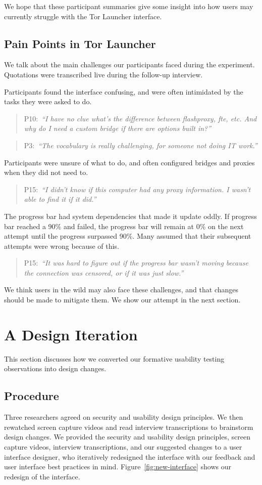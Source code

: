 \documentclass[USenglish,oneside,twocolumn]{article}
\newcommand{\pquote}[2]{
\begin{quotation}
\noindent #1:~\textit{#2}
\end{quotation}
}
\begin{document}
We hope that these participant summaries give some insight into how users may currently struggle with the Tor Launcher interface. 

\subsection{Pain Points in Tor Launcher} 
\label{sec:pain-points}
We talk about the main challenges our participants faced during the experiment. 
Quotations were transcribed live during the follow-up interview.

Participants found the interface confusing, and were often intimidated by the tasks they were asked to do. 

\pquote{P10}{``I have no clue what's the difference between flashproxy, fte, etc. And why do I need a custom bridge if there are options built in?''}

\pquote{P3}{``The vocabulary is really challenging, for someone not doing IT work.''}

Participants were unsure of what to do, and often configured bridges and proxies when they did not need to.  

\pquote{P15}{``I didn't know if this computer had any proxy information. I wasn't able to find it if it did.''}

The progress bar had system dependencies that made it update oddly. If progress bar reached a 90\% and failed, the progress bar will remain at 0\% on the next attempt until the progress surpassed 90\%. Many assumed that their subsequent attempts were wrong because of this.

\pquote{P15}{``It was hard to figure out if the progress bar wasn't moving because the connection was censored, or if it was just slow.''}

We think users in the wild may also face these challenges, and that changes should be made to mitigate them. We show our attempt in the next section. 

\section{A Design Iteration}
\label{sec:design} 
This section discusses how we converted our formative usability testing observations into design changes. 

\subsection{Procedure} 
Three researchers agreed on security and usability design principles. 
We then rewatched screen capture videos and read interview transcriptions to brainstorm design changes. We provided the security and usability design principles, screen capture videos, interview transcriptions, and our suggested changes to a user interface designer, who iteratively redesigned the interface with our feedback and user interface best practices in mind. Figure~\ref{fig:new-interface} shows our redesign of the interface. 
\end{document}
